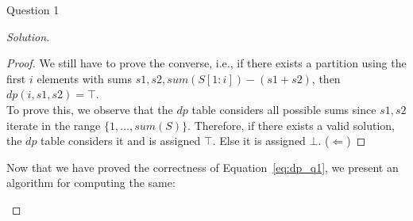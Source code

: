 \begin{solution}{Question 1}
\begin{proof}[Solution]
\begin{proof}
            We still have to prove the converse, i.e., if there exists a partition using the first $i$ elements with sums $s1, s2, sum(S[1:i])-(s1+s2)$, then $dp(i, s1, s2)=\top$.\\
            To prove this, we observe that the $dp$ table considers all possible sums since $s1, s2$ iterate in the range $\{1, \ldots, sum(S)\}$. Therefore, if there exists a valid solution, the $dp$ table considers it and is assigned $\top$. Else it is assigned $\bot$. ($\Longleftarrow$)
        \end{proof}
        Now that we have proved the correctness of Equation~\ref{eq:dp_q1}, we present an algorithm for computing the same:
        \begin{algorithm}[H]
            \caption{DP solution for partitioning}
            \begin{algorithmic}
                                \EndIf{}
                                \EndIf{}
                            \EndFor{}
                        \EndFor{}
                    \EndFor{}
                    \State{}
                        \EndIf{}
                    \EndFor{}

                        
                \EndProcedure{}
            \end{algorithmic}
        \end{algorithm}
    \end{proof}
\end{solution}
